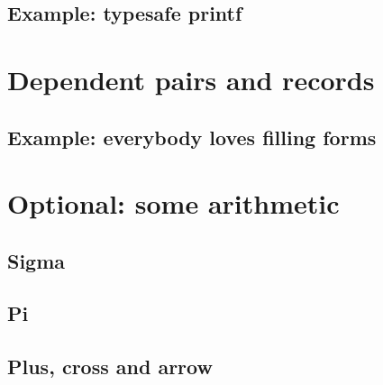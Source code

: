 \documentclass{beamer}
\begin{document}
\subsection{Example: typesafe printf}



\section{Dependent pairs and records}

\subsection{Example: everybody loves filling forms}

\section{Optional: some arithmetic}

\subsection{Sigma}

\subsection{Pi}

\subsection{Plus, cross and arrow}

\end{document}
